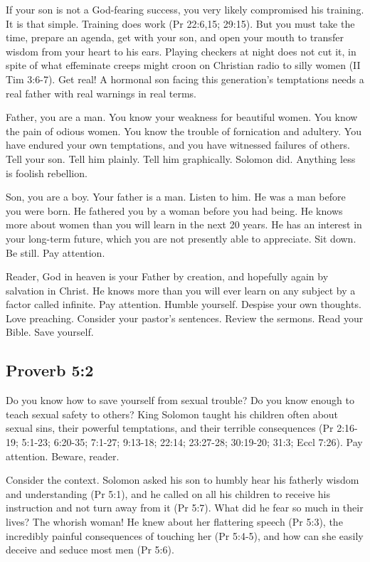 If your son is not a God-fearing success, you very likely compromised his training. It is that simple. Training does work (Pr 22:6,15; 29:15). But you must take the time, prepare an agenda, get with your son, and open your mouth to transfer wisdom from your heart to his ears. Playing checkers at night does not cut it, in spite of what effeminate creeps might croon on Christian radio to silly women (II Tim 3:6-7). Get real! A hormonal son facing this generation’s temptations needs a real father with real warnings in real terms.

Father, you are a man. You know your weakness for beautiful women. You know the pain of odious women. You know the trouble of fornication and adultery. You have endured your own temptations, and you have witnessed failures of others. Tell your son. Tell him plainly. Tell him graphically. Solomon did. Anything less is foolish rebellion.

Son, you are a boy. Your father is a man. Listen to him. He was a man before you were born. He fathered you by a woman before you had being. He knows more about women than you will learn in the next 20 years. He has an interest in your long-term future, which you are not presently able to appreciate. Sit down. Be still. Pay attention.

Reader, God in heaven is your Father by creation, and hopefully again by salvation in Christ. He knows more than you will ever learn on any subject by a factor called infinite. Pay attention. Humble yourself. Despise your own thoughts. Love preaching. Consider your pastor’s sentences. Review the sermons. Read your Bible. Save yourself.

\subsection{Proverb 5:2}
Do you know how to save yourself from sexual trouble? Do you know enough to teach sexual safety to others? King Solomon taught his children often about sexual sins, their powerful temptations, and their terrible consequences (Pr 2:16-19; 5:1-23; 6:20-35; 7:1-27; 9:13-18; 22:14; 23:27-28; 30:19-20; 31:3; Eccl 7:26). Pay attention. Beware, reader.

Consider the context. Solomon asked his son to humbly hear his fatherly wisdom and understanding (Pr 5:1), and he called on all his children to receive his instruction and not turn away from it (Pr 5:7). What did he fear so much in their lives? The whorish woman! He knew about her flattering speech (Pr 5:3), the incredibly painful consequences of touching her (Pr 5:4-5), and how can she easily deceive and seduce most men (Pr 5:6).

